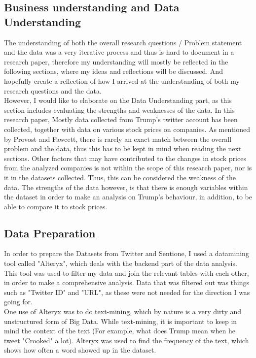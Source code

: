 \documentclass[11pt]{article}
\begin{document}
\subsection{Business understanding and Data Understanding}
The understanding of both the overall research questions / Problem statement and the data was a very iterative process and thus is hard to document in a research paper, therefore my understanding will mostly be reflected in the following sections, where my ideas and reflections will be discussed.  And hopefully create a reflection of how I arrived at the understanding of both my research questions and the data. \\

However, I would like to elaborate on the Data Understanding part, as this section includes evaluating the strengths and weaknesses of the data. In this research paper, Mostly data collected from Trump's twitter account has been collected, together with data on various stock prices on companies.  As mentioned by Provost and Fawcett, there is rarely an exact match between the overall problem and the data, thus this has to be kept in mind when reading the next sections. Other factors that may have contributed to the changes in stock prices from the analyzed companies is not within the scope of this research paper, nor is it in the datasets collected. Thus, this can be considered the weakness of the data. The strengths of the data however, is that there is enough variables within the dataset in order to make an analysis on Trump's behaviour, in addition, to be able to compare it to stock prices.

\subsection{Data Preparation}
In order to prepare the Datasets from Twitter and Sentione, I used a datamining tool called "Alteryx", which deals with the backend part of the data analysis. This tool was used to filter my data and join the relevant tables with each other, in order to make a comprehensive analysis. Data that was filtered out was things such as "Twitter ID" and "URL", as these were not needed for the direction I was going for. \\


One use of Alteryx was to do text-mining, which by nature is a very dirty and unstructured form of Big Data. While text-mining, it is important to keep in mind the context of the text (For example, what does Trump mean when he tweet "Crooked" a lot). Alteryx was used to find the frequency of the text, which shows how often a word showed up in the dataset.  \\
\end{document}
